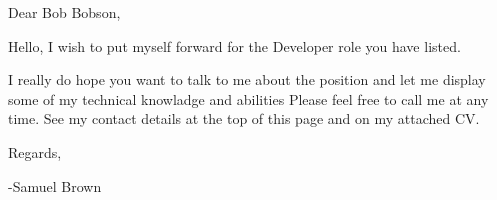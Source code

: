 \documentclass[12pt]{developercv} %
\begin{document}

Dear Bob Bobson,
\vspace{+\baselineskip}

Hello, I wish to put myself forward for the  Developer role you have listed.

\vspace{+\baselineskip}
I really do hope you want to talk to me about the position and let me display some of my technical knowladge and abilities Please feel free to call me at any time. See my contact details at the top of this page and on my attached CV.


\vspace{+\baselineskip}

Regards,


-Samuel Brown


\pagebreak

\end{document}
